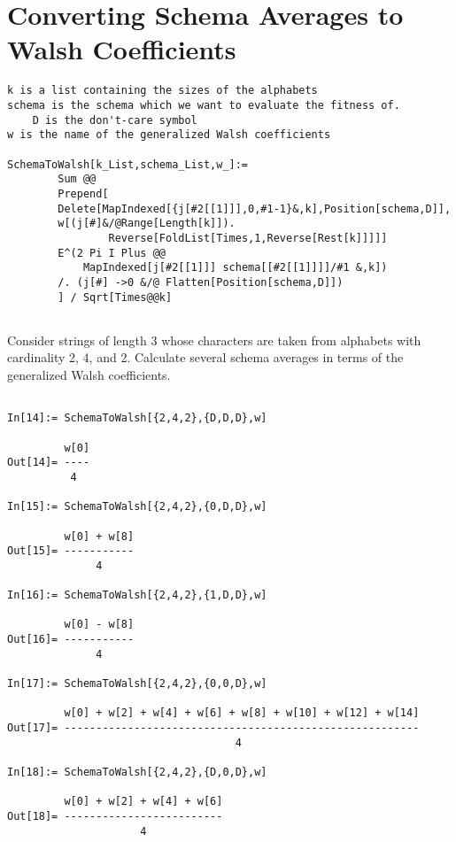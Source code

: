\section{Converting Schema Averages to Walsh Coefficients}
\begin{verbatim}
k is a list containing the sizes of the alphabets
schema is the schema which we want to evaluate the fitness of.
	D is the don't-care symbol
w is the name of the generalized Walsh coefficients

SchemaToWalsh[k_List,schema_List,w_]:=
        Sum @@
        Prepend[
        Delete[MapIndexed[{j[#2[[1]]],0,#1-1}&,k],Position[schema,D]],
        w[(j[#]&/@Range[Length[k]]).
                Reverse[FoldList[Times,1,Reverse[Rest[k]]]]]
        E^(2 Pi I Plus @@
	        MapIndexed[j[#2[[1]]] schema[[#2[[1]]]]/#1 &,k])
        /. (j[#] ->0 &/@ Flatten[Position[schema,D]])
        ] / Sqrt[Times@@k]


\end{verbatim}
\begin{example}
Consider strings of length 3 whose characters are taken from alphabets
with cardinality 2, 4, and 2.  Calculate several schema averages in terms 
of the generalized Walsh coefficients.
\end{example}
\begin{verbatim}

In[14]:= SchemaToWalsh[{2,4,2},{D,D,D},w]

         w[0]
Out[14]= ----
          4

In[15]:= SchemaToWalsh[{2,4,2},{0,D,D},w]

         w[0] + w[8]
Out[15]= -----------
              4

In[16]:= SchemaToWalsh[{2,4,2},{1,D,D},w]

         w[0] - w[8]
Out[16]= -----------
              4

In[17]:= SchemaToWalsh[{2,4,2},{0,0,D},w]

         w[0] + w[2] + w[4] + w[6] + w[8] + w[10] + w[12] + w[14]
Out[17]= --------------------------------------------------------
                                    4

In[18]:= SchemaToWalsh[{2,4,2},{D,0,D},w]

         w[0] + w[2] + w[4] + w[6]
Out[18]= -------------------------
                     4

\end{verbatim}
